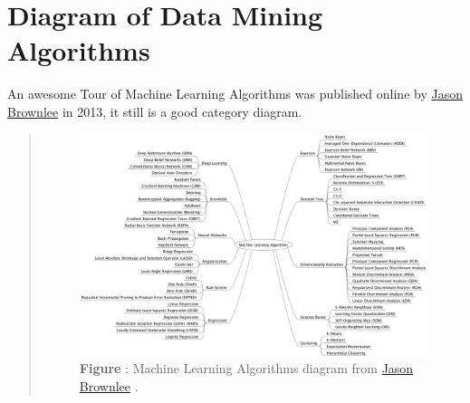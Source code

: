\documentclass[letterpaper,11pt,english]{sphinxmanual}
\begin{document}
\section{Diagram of Data Mining Algorithms}
\label{algsummary:diagram-of-data-mining-algorithms}
An awesome Tour of Machine Learning Algorithms was published online by \href{http://machinelearningmastery.com/a-tour-of-machine-learning-algorithms/}{Jason Brownlee}  in 2013, it still is a good category diagram.
\begin{quote}
\begin{figure}[htbp]
\centering
\capstart

\includegraphics{mlalgs.png}
\caption{\textbf{Figure} :  Machine Learning Algorithms diagram from \href{http://machinelearningmastery.com/a-tour-of-machine-learning-algorithms/}{Jason Brownlee} .}\end{figure}
\end{quote}
\end{document}
